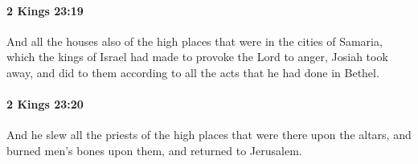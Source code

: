 		\paragraph{2 Kings 23:19} %
			\label{2KINGS-23-19}

			And all the houses also of the high places that were in the cities of Samaria, which the kings of Israel had made to provoke the Lord to anger, Josiah took away, and did to them according to all the acts that he had done in Bethel.


		\paragraph{2 Kings 23:20} %
			\label{2KINGS-23-20}

			And he slew all the priests of the high places that were there upon the altars, and burned men’s bones upon them, and returned to Jerusalem.

